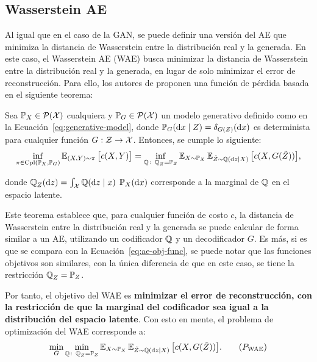 \subsection{Wasserstein AE}\label{ssec:WAE}  %

Al igual que en el caso de la GAN, se puede definir una versión del AE que minimiza la distancia de Wasserstein entre la distribución real y la generada. En este caso, el Wasserstein AE (WAE) \cite{tolstikhin2017wasserstein} busca minimizar la distancia de Wasserstein entre la distribución real y la generada, en lugar de solo minimizar el error de reconstrucción. Para ello, los autores de \cite{tolstikhin2017wasserstein} proponen una función de pérdida basada en el siguiente teorema:

\begin{theorem}
    Sea $\Prob_X\in \ProbSpace$ cualquiera y  $\Prob_G\in \ProbSpace$ un modelo generativo definido como en la Ecuación~\eqref{eq:generative-model}, donde $\Prob_G(\dd x \mid Z) = \delta_{G(Z)}(\dd x)$ es determinista para cualquier función $G:\mathcal{Z} \to \mathcal{X}$. Entonces, se cumple lo siguiente:
    \begin{equation}
        \inf_{\pi\in\Cpl(\Prob_X, \Prob_G)} \Exp_{(X, Y)\sim\pi} \qty\big[ c(X, Y) ] = \inf_{\ProbQ \colon \ProbQ_Z = \Prob_Z} \Exp_{X\sim\Prob_X} \Exp_{\tilde Z\sim\ProbQ(\dd z \mid X)} \qty\big[ c(X, G(\tilde Z)) ],
    \end{equation}

    donde
    $\ProbQ_Z(\dd z) = \int_{\cX} \ProbQ(\dd z \mid x)\; \Prob_X(\dd x)$
    corresponde a la marginal de $\ProbQ$ en el espacio latente.

\end{theorem}

Este teorema establece que, para cualquier función de costo $c$, la distancia de Wasserstein entre la distribución real y la generada se puede calcular de forma similar a un AE, utilizando un codificador $\ProbQ$ y un decodificador $G$. Es más, si es que se compara con la Ecuación~\eqref{eq:ae-obj-func}, se puede notar que las funciones objetivos son similares, con la única diferencia de que en este caso, se tiene la restricción $\ProbQ_Z = \Prob_Z$.

Por tanto, el objetivo del WAE es \textbf{minimizar el error de reconstrucción, con la restricción de que la marginal del codificador sea igual a la distribución del espacio latente}. Con esto en mente, el problema de optimización del WAE corresponde a:
\begin{equation}

    \min_{G} \min_{\ProbQ\colon \ProbQ_Z = \Prob_Z} \Exp_{X\sim\Prob_X} \Exp_{\tilde Z\sim\ProbQ(\dd z \mid X)} \qty\big[ c(X, G(\tilde Z)) ].\tag{$P_{\mathrm{WAE}}$}

\end{equation}

